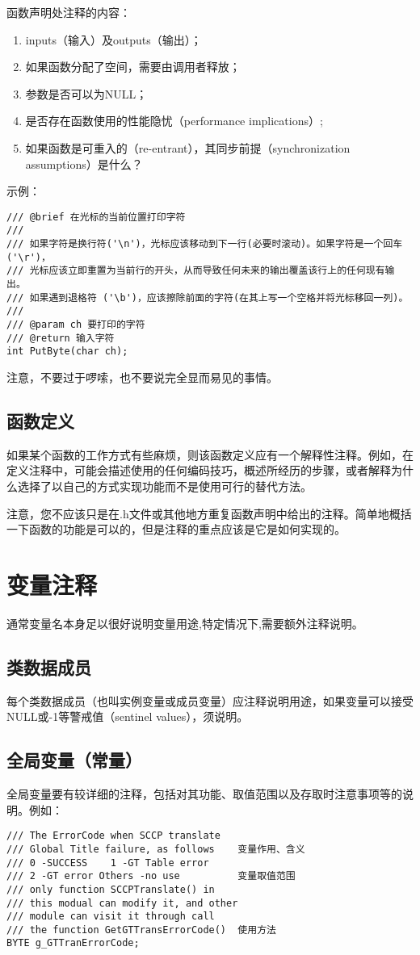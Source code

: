 函数声明处注释的内容：
\begin{enumerate}[1）]
\item inputs（输入）及outputs（输出）；
\item 如果函数分配了空间，需要由调用者释放；
\item 参数是否可以为NULL；
\item 是否存在函数使用的性能隐忧（performance implications）;
\item 如果函数是可重入的（re-entrant），其同步前提（synchronization assumptions）是什么？
\end{enumerate}

示例：
\begin{verbatim}
/// @brief 在光标的当前位置打印字符
///
/// 如果字符是换行符('\n')，光标应该移动到下一行(必要时滚动)。如果字符是一个回车('\r')，
/// 光标应该立即重置为当前行的开头，从而导致任何未来的输出覆盖该行上的任何现有输出。
/// 如果遇到退格符 ('\b')，应该擦除前面的字符(在其上写一个空格并将光标移回一列)。
///
/// @param ch 要打印的字符
/// @return 输入字符
int PutByte(char ch);
\end{verbatim}

注意，不要过于啰嗦，也不要说完全显而易见的事情。


\subsection{函数定义}
如果某个函数的工作方式有些麻烦，则该函数定义应有一个解释性注释。例如，在定义注释中，可能会描述使用的任何编码技巧，概述所经历的步骤，或者解释为什么选择了以自己的方式实现功能而不是使用可行的替代方法。

注意，您不应该只是在.h文件或其他地方重复函数声明中给出的注释。简单地概括一下函数的功能是可以的，但是注释的重点应该是它是如何实现的。


\section{变量注释}
通常变量名本身足以很好说明变量用途,特定情况下,需要额外注释说明。


\subsection{类数据成员}
每个类数据成员（也叫实例变量或成员变量）应注释说明用途，如果变量可以接受NULL或-1等警戒值（sentinel values），须说明。


\subsection{全局变量（常量）}
全局变量要有较详细的注释，包括对其功能、取值范围以及存取时注意事项等的说明。例如：
\begin{verbatim}
/// The ErrorCode when SCCP translate
/// Global Title failure, as follows    变量作用、含义
/// 0 -SUCCESS    1 -GT Table error
/// 2 -GT error Others -no use          变量取值范围
/// only function SCCPTranslate() in
/// this modual can modify it, and other
/// module can visit it through call
/// the function GetGTTransErrorCode()  使用方法
BYTE g_GTTranErrorCode;
\end{verbatim}


